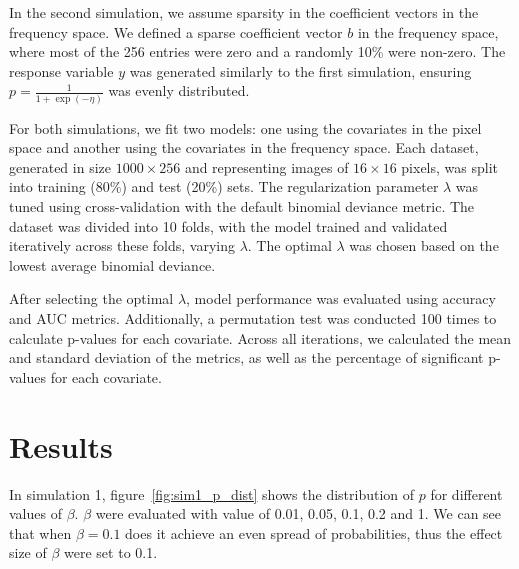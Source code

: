 \documentclass[12pt]{article}
\begin{document}
In the second simulation, we assume sparsity in the coefficient vectors in the
frequency space. We defined a sparse coefficient vector \( b \) in the
frequency space, where most of the 256 entries were zero and a randomly 10\%
were non-zero. The response variable \( y \) was generated similarly to the
first simulation, ensuring \( p = \frac{1}{1 + \exp(-\eta)} \) was evenly
distributed.

For both simulations, we fit two models: one using the covariates in the pixel
space and another using the covariates in the frequency space. Each dataset,
generated in size \( 1000 \times 256 \) and representing images of \( 16 \times
16 \) pixels, was split into training (80\%) and test (20\%) sets. The
regularization parameter \( \lambda \) was tuned using cross-validation with
the default binomial deviance metric. The dataset was divided into 10 folds,
with the model trained and validated iteratively across these folds, varying \(
\lambda \). The optimal \( \lambda \) was chosen based on the lowest average
binomial deviance.

After selecting the optimal \( \lambda \), model performance was evaluated
using accuracy and AUC metrics. Additionally, a permutation test was conducted
100 times to calculate p-values for each covariate. Across all iterations, we
calculated the mean and standard deviation of the metrics, as well as the
percentage of significant p-values for each covariate.

\section*{Results}

In simulation 1, figure~\ref{fig:sim1_p_dist} shows the distribution of 
\( p \) for different values of \( \beta	\). \( \beta \) were evaluated with
value of 0.01, 0.05, 0.1, 0.2 and 1. We can see that when \( \beta = 0.1 \) does
it achieve an even spread of probabilities, thus the effect size of \( \beta \)
were set to 0.1.
\end{document}
